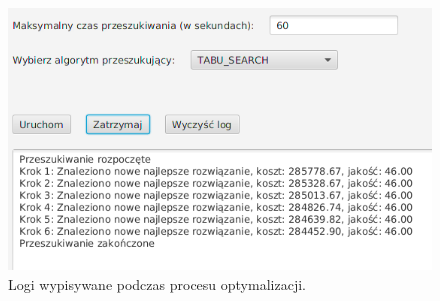 \begin{figure}[ht]{}
	\centering
	\includegraphics[scale=0.7]{images/algo_log.png}
	\caption {
		 Logi wypisywane podczas procesu optymalizacji.
	}
	\label{fig:algo-log}
\end{figure}